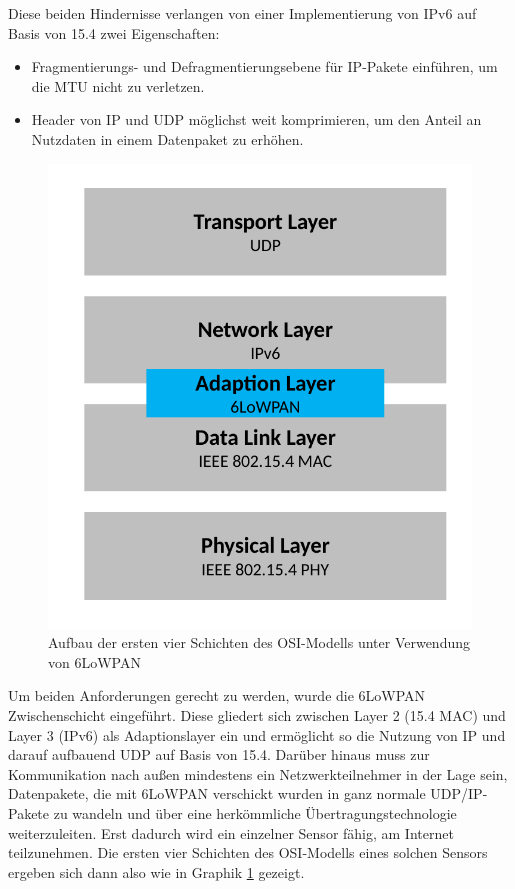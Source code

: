 Diese beiden Hindernisse verlangen von einer Implementierung von IPv6 auf Basis von 15.4 zwei Eigenschaften:
\begin{itemize}
	\item Fragmentierungs- und Defragmentierungsebene für IP-Pakete einführen, um die MTU nicht zu verletzen.
	\item Header von IP und UDP möglichst weit komprimieren, um den Anteil an Nutzdaten in einem Datenpaket zu erhöhen.
\end{itemize}
\begin{figure}
	\centering
	\includegraphics[width=\textwidth/2]{Grafiken-Alex/6lowpan-osi.pdf}
	\caption{Aufbau der ersten vier Schichten des OSI-Modells unter Verwendung von 6LoWPAN}
	\label{6lowpan-osi}
\end{figure}
Um beiden Anforderungen gerecht zu werden, wurde die 6LoWPAN Zwischenschicht eingeführt. Diese gliedert sich zwischen Layer 2 (15.4 MAC) und Layer 3 (IPv6) als Adaptionslayer ein und ermöglicht so die Nutzung von IP und darauf aufbauend UDP auf Basis von 15.4. Darüber hinaus muss zur Kommunikation nach außen mindestens ein Netzwerkteilnehmer in der Lage sein, Datenpakete, die mit 6LoWPAN verschickt wurden in ganz normale UDP/IP-Pakete zu wandeln und über eine herkömmliche Übertragungstechnologie weiterzuleiten. Erst dadurch wird ein einzelner Sensor fähig, am Internet teilzunehmen. Die ersten vier Schichten des OSI-Modells eines solchen Sensors ergeben sich dann also wie in Graphik \ref{6lowpan-osi} gezeigt.
  
 
